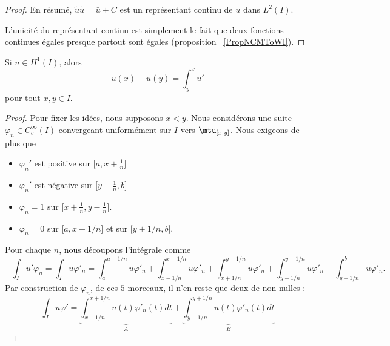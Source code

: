 \begin{proof}
	En résumé, \( \tilde u\tilde u=\bar u+C\) est un représentant continu de \( u\) dans \( L^2(I)\).

	L'unicité du représentant continu est simplement le fait que deux fonctions continues égales presque partout sont égales (proposition ~\ref{PropNCMToWI}).

\end{proof}

\begin{proposition}     \label{PropGWOIoDg}
	Si \( u\in H^1(I)\), alors
	\begin{equation}
		u(x)-u(y)=\int_y^xu'
	\end{equation}
	pour tout \( x,y\in I\).
\end{proposition}

\begin{proof}
	Pour fixer les idées, nous supposons \( x<y\). Nous considérons une suite \( \varphi_n\in C^{\infty}_c(I)\) convergeant uniformément sur \( I\) vers \( \mtu_{\mathopen[ x , y \mathclose]}\). Nous exigeons de plus que
	\begin{itemize}
		\item
		      \( \varphi_n'\) est positive sur \( \mathopen[ a , x+\frac{1}{ n } \mathclose]\)
		\item
		      \( \varphi_n'\) est négative sur \( \mathopen[ y-\frac{1}{ n } , b \mathclose]\)
		\item
		      \( \varphi_n=1\) sur \( \mathopen[ x+\frac{1}{ n } , y-\frac{1}{ n } \mathclose]\).
		\item
		      \( \varphi_n=0\) sur \( \mathopen[ a , x-1/n \mathclose]\) et sur \( \mathopen[ y+1/n , b \mathclose]\).
	\end{itemize}
	Pour chaque \( n\), nous découpons l'intégrale comme
	\begin{equation}        \label{EqRPwqpve}
		-\int_Iu'\varphi_n=\int_Iu\varphi'_n=\int_a^{a-1/n}u\varphi'_n+\int_{x-1/n}^{x+1/n}u\varphi'_n+\int_{x+1/n}^{y-1/n}u\varphi'_n+\int_{y-1/n}^{y+1/n}u\varphi'_n+\int_{y+1/n}^{b}u\varphi'_n.
	\end{equation}
	Par construction de \( \varphi_n\), de ces \( 5\) morceaux, il n'en reste que deux de non nulles :
	\begin{equation}
		\int_Iu\varphi'=\underbrace{\int_{x-1/n}^{x+1/n}u(t)\varphi'_n(t)dt}_A+\underbrace{\int_{y-1/n}^{y+1/n}u(t)\varphi'_n(t)dt}_B
	\end{equation}


\end{proof}
